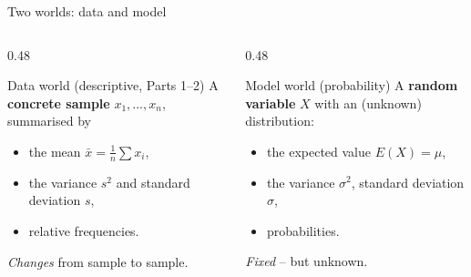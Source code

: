 \documentclass[aspectratio=169,11pt]{beamer}
\begin{document}
\begin{frame}{Two worlds: data and model}
  \begin{columns}[T]
    \begin{column}{0.48\textwidth}
      \begin{block}{Data world (descriptive, Parts 1--2)}
        A \textbf{concrete sample} $x_1,\dots,x_n$, summarised by
        \begin{itemize}\setlength{\itemsep}{1pt}
          \item the mean $\bar x=\tfrac1n\sum x_i$,
          \item the variance $s^2$ and standard deviation $s$,
          \item relative frequencies.
        \end{itemize}
        \emph{Changes} from sample to sample.
      \end{block}
    \end{column}
    \begin{column}{0.48\textwidth}
      \begin{block}{Model world (probability)}
        A \textbf{random variable} $X$ with an (unknown) distribution:
        \begin{itemize}\setlength{\itemsep}{1pt}
          \item the expected value $E(X)=\mu$,
          \item the variance $\sigma^2$, standard deviation $\sigma$,
          \item probabilities.
        \end{itemize}
        \emph{Fixed} -- but unknown.
      \end{block}
    \end{column}
  \end{columns}
\end{frame}
\end{document}
